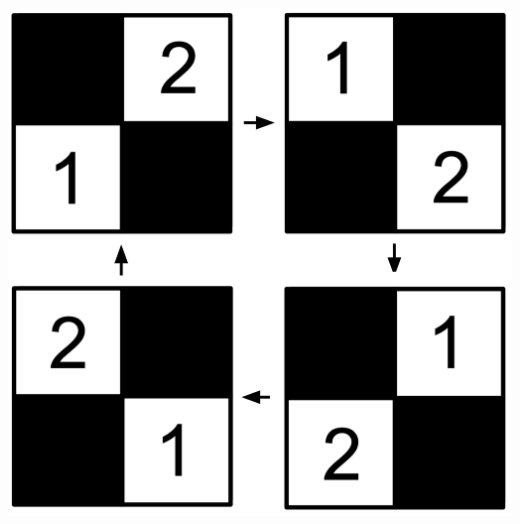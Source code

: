 \documentclass{book}
\theoremstyle{definition}
\begin{document}
\begin{center}
\begin{tcolorbox}[width=2.3in,colback={white},coltitle=white]
\begin{center}
\ \\
\\
\end{center}
\end{tcolorbox}
\end{center}
\ \\
\ \\
\ \\
\begin{center}
\includegraphics[scale=0.4]{eckhil.png}
\end{center}




\thispagestyle{empty}


\newpage


\begin{center}

\pagecolor{white}
\color{black}

\end{center}

\thispagestyle{empty}




\newpage
\pagecolor{white}
\color{black}
\ \\
\ \\
\thispagestyle{empty}
\end{document}
